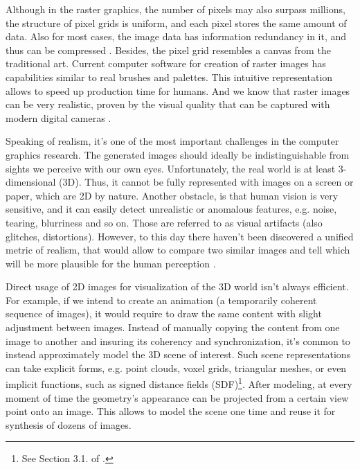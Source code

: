 Although in the raster graphics, the number of pixels may also surpass millions, the structure of pixel grids is uniform, and each pixel stores the same amount of data. Also for most cases, the image data has information redundancy in it, and thus can be compressed \cite{aux:compression18}. Besides, the pixel grid resembles a canvas from the traditional art. Current computer software for creation of raster images has capabilities similar to real brushes and palettes. This intuitive representation allows to speed up production time for humans. And we know that raster images can be very realistic, proven by the visual quality that can be captured with modern digital cameras \cite{aux:camera21}.

Speaking of realism, it's one of the most important challenges in the computer graphics research. The generated images should ideally be indistinguishable from sights we perceive with our own eyes. Unfortunately, the real world is at least 3-dimensional (3D). Thus, it cannot be fully represented with images on a screen or paper, which are 2D by nature. Another obstacle, is that human vision is very sensitive, and it can easily detect unrealistic or anomalous features, e.g. noise, tearing, blurriness and so on. Those are referred to as visual artifacts (also glitches, distortions). However, to this day there haven't been discovered a unified metric of realism, that would allow to compare two similar images and tell which will be more plausible for the human perception \cite{metric:wang11}.

Direct usage of 2D images for visualization of the 3D world isn't always efficient. For example, if we intend to create an animation (a temporarily coherent sequence of images), it would require to draw the same content with slight adjustment between images. Instead of manually copying the content from one image to another and insuring its coherency and synchronization, it's common to instead approximately model the 3D scene of interest. Such scene representations can take explicit forms, e.g. point clouds, voxel grids, triangular meshes, or even implicit functions, such as signed distance fields (SDF)\cite{survey:advances-nn22}\footnote{See Section 3.1. of \cite{survey:advances-nn22}.}\label{intro:3d-representations-paragraph}. After modeling, at every moment of time the geometry's appearance can be projected from a certain view point onto an image. This allows to model the scene one time and reuse it for synthesis of dozens of images.


